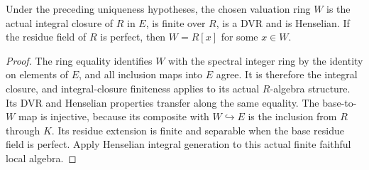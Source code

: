 \begin{corollary}
\label{fw:chosen-extension-integers}
\leanok
Under the preceding uniqueness hypotheses, the chosen valuation ring
$W$ is the actual integral closure of $R$ in $E$, is finite over $R$,
is a DVR and is Henselian. If the residue field of $R$ is perfect,
then $W=R[x]$ for some $x\in W$.
\end{corollary}
\begin{proof}
The ring equality identifies $W$ with the spectral integer ring by the
identity on elements of $E$, and all inclusion maps into $E$ agree.
It is therefore the integral closure, and integral-closure finiteness
applies to its actual $R$-algebra structure. Its DVR and Henselian
properties transfer along the same equality. The base-to-$W$ map is
injective, because its composite with $W\hookrightarrow E$ is the
inclusion from $R$ through $K$. Its residue extension is finite and
separable when the base residue field is perfect. Apply Henselian
integral generation to this actual finite faithful local algebra.
\end{proof}


